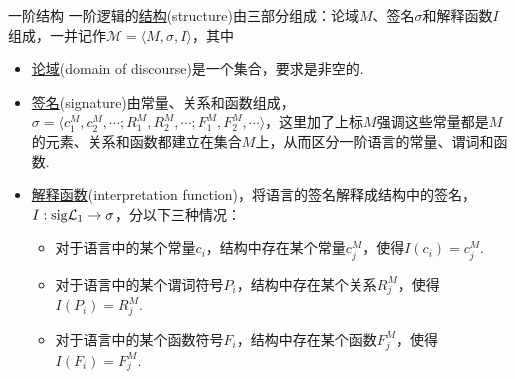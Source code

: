 \documentclass[main.tex]{subfiles}
\begin{document}
\begin{definition}{一阶结构}
    一阶逻辑的\uline{结构}(structure)由三部分组成：论域\(M\)、签名\(\sigma\)和解释函数\(I\)组成，一并记作\(\mathcal{M} = \langle M, \sigma, I \rangle\)，其中
    \begin{itemize}
        \item \uline{论域}(domain of discourse)是一个集合，要求是非空的.
        \item \uline{签名}(signature)由常量、关系和函数组成，\(\sigma = \langle c_1^M, c_2^M, \cdots; R_1^M, R_2^M, \cdots; F_1^M, F_2^M, \cdots \rangle\)，这里加了上标\(M\)强调这些常量都是\(M\)的元素、关系和函数都建立在集合\(M\)上，从而区分一阶语言的常量、谓词和函数.
        \item \uline{解释函数}(interpretation function)，将语言的签名解释成结构中的签名，\(I: {\rm sig}\mathcal{L}_1 \to \sigma\)，分以下三种情况：
        \begin{itemize}
            \item 对于语言中的某个常量\(c_i\)，结构中存在某个常量\(c_j^M\)，使得\(I(c_i) = c_j^M\).
            \item 对于语言中的某个谓词符号\(P_i\)，结构中存在某个关系\(R_j^M\)，使得\(I(P_i) = R_j^M\).
            \item 对于语言中的某个函数符号\(F_i\)，结构中存在某个函数\(F_j^M\)，使得\(I(F_i) = F_j^M\).
        \end{itemize}
    \end{itemize}
\end{definition}
\end{document}
